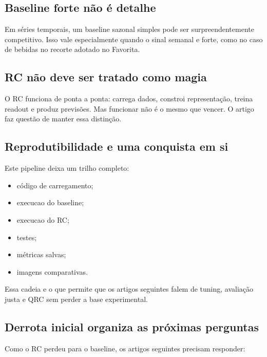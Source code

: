 \documentclass[12pt]{article}
\providecommand{\tightlist}{%
          \setlength{\itemsep}{0pt}\setlength{\parskip}{0pt}}
\begin{document}
\subsection{Baseline forte não é detalhe}\label{81-baseline-forte-nuxe3o-uxe9-detalhe}

Em séries temporais, um baseline sazonal simples pode ser surpreendentemente competitivo. Isso vale especialmente quando o sinal semanal e forte, como no caso de bebidas no recorte adotado no Favorita.

\subsection{RC não deve ser tratado como magia}\label{82-rc-nuxe3o-deve-ser-tratado-como-magia}

O RC funciona de ponta a ponta: carrega dados, constroi representação, treina readout e produz previsões. Mas funcionar não é o mesmo que vencer. O artigo faz questão de manter essa distinção.

\subsection{Reprodutibilidade e uma conquista em si}\label{83-reprodutibilidade-e-uma-conquista-em-si}

Este pipeline deixa um trilho completo:

\begin{itemize}
\tightlist
\item
  código de carregamento;
\item
  execucao do baseline;
\item
  execucao do RC;
\item
  testes;
\item
  métricas salvas;
\item
  imagens comparativas.
\end{itemize}

Essa cadeia e o que permite que os artigos seguintes falem de tuning, avaliação justa e QRC sem perder a base experimental.

\subsection{Derrota inicial organiza as próximas perguntas}\label{84-derrota-inicial-organiza-as-pruxf3ximas-perguntas}

Como o RC perdeu para o baseline, os artigos seguintes precisam responder:
\end{document}
